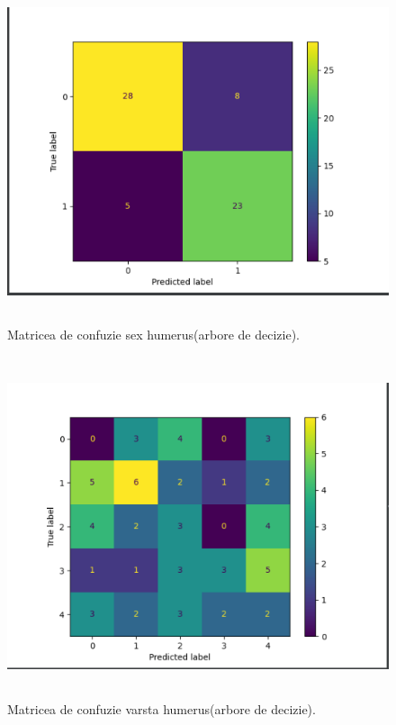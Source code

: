 \documentclass[runningheads,a4paper,11pt]{report}
\begin{document}
\begin{figure}
    \centering
    \includegraphics[height=10cm]{Imagini/matrice_confuzie_sex_arbore.PNG}
    \caption{Matricea de confuzie sex humerus(arbore de decizie).}
    \label{matrice_confuzie_sex}
\end{figure}

\begin{figure}
    \centering
    \includegraphics[height=10cm]{Imagini/matrice_confuzie_varsta_arbore_decizie.png}
    \caption{Matricea de confuzie varsta humerus(arbore de decizie).}
    \label{matrice_confuzie_varsta}
\end{figure}
\end{document}
